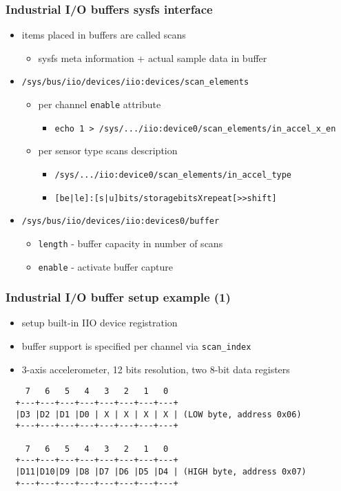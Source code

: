 \documentclass[aspectratio=169]{beamer}
\begin{document}

\begin{frame}
\frametitle{Industrial I/O buffers sysfs interface}
\begin{itemize}
    \item items placed in buffers are called scans
    \begin{itemize}
        \item sysfs meta information + actual sample data in buffer
    \end{itemize}
    \item \texttt{/sys/bus/iio/devices/iio:devices/scan\_elements}
    \begin{itemize}
        \item per channel \texttt{enable} attribute
        \begin{itemize}
            \item \texttt{echo 1 > /sys/.../iio:device0/scan\_elements/in\_accel\_x\_en}
        \end{itemize}
        \item per sensor type scans description
        \begin{itemize}
            \item \texttt{/sys/.../iio:device0/scan\_elements/in\_accel\_type}
            \item \texttt{[be|le]:[s|u]bits/storagebitsXrepeat[>>shift]}
        \end{itemize}
    \end{itemize}
    \item \texttt{/sys/bus/iio/devices/iio:devices0/buffer}
    \begin{itemize}
        \item \texttt{length} - buffer capacity in number of scans
        \item \texttt{enable} - activate buffer capture
    \end{itemize}
\end{itemize}
\end{frame}

\begin{frame}[fragile]
\frametitle{Industrial I/O buffer setup example (1)}
\begin{itemize}
    \item setup built-in IIO device registration
    \item buffer support is specified per channel via \texttt{scan\_index}
    \item 3-axis accelerometer, 12 bits resolution, two 8-bit data registers
\end{itemize}
\begin{verbatim}
    7   6   5   4   3   2   1   0
  +---+---+---+---+---+---+---+---+
  |D3 |D2 |D1 |D0 | X | X | X | X | (LOW byte, address 0x06)
  +---+---+---+---+---+---+---+---+

    7   6   5   4   3   2   1   0
  +---+---+---+---+---+---+---+---+
  |D11|D10|D9 |D8 |D7 |D6 |D5 |D4 | (HIGH byte, address 0x07)
  +---+---+---+---+---+---+---+---+
\end{verbatim}
\end{frame}
\end{document}

